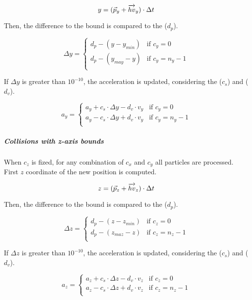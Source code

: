 \[
y = (\vec{p}_y + \overrightarrow{hv}_y) \cdot \Delta t \\
\]

Then, the difference to the bound is compared to the 
($d_p$).

\[
\Delta y = 
\begin{cases}
d_p - (y - y_{min}) & \text{if } c_y = 0\\
d_p - (y_{may} - y) & \text{if } c_y = n_y -1\\
\end{cases}
\]

If $\Delta y$ is greater than $10^{-10}$, the acceleration is updated,
considering the  ($c_s$) and 
($d_v$).

\[
a_y = 
\begin{cases}
  a_y + c_s \cdot \Delta y - d_v \cdot v_y & \text{if  } c_y = 0\\
  a_y - c_s \cdot \Delta y + d_v \cdot v_y & \text{if  } c_y = n_y-1\\
\end{cases}
\]

\subparagraph{Collisions with z-axis bounds}

When $c_z$ is fized, for any combination of $c_x$ and $c_y$ all particles are
processed. First $z$ coordinate of the new position is computed.

\[
z = (\vec{p}_z + \overrightarrow{hv}_z) \cdot \Delta t \\
\]

Then, the difference to the bound is compared to the 
($d_p$).

\[
\Delta z = 
\begin{cases}
d_p - (z - z_{min}) & \text{if } c_z = 0\\
d_p - (z_{maz} - z) & \text{if } c_z = n_z -1\\
\end{cases}
\]

If $\Delta z$ is greater than $10^{-10}$, the acceleration is updated,
considering the  ($c_s$) and 
($d_v$).

\[
a_z = 
\begin{cases}
  a_z + c_s \cdot \Delta z - d_v \cdot v_z & \text{if  } c_z = 0\\
  a_z - c_s \cdot \Delta z + d_v \cdot v_z & \text{if  } c_z = n_z-1\\
\end{cases}
\]


